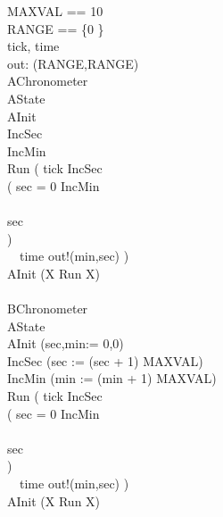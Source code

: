 \begin{circus}
MAXVAL == 10\\
RANGE == \{0 \}\\
\circchannel tick, time\\
\circchannel out: (RANGE,RANGE)\\
\circprocess AChronometer \circdef\\
\circbegin \circstate AState \\
 AInit \\
 IncSec \\
 IncMin \\
 Run \circdef
    (
        tick \then \lschexpract IncSec \rschexpract \circseq\\
          (
          \lcircguard sec = 0 \rcircguard \circguard
          \lschexpract IncMin \rschexpract\\
          \extchoice\\ \lcircguard sec  \rcircguard \circguard \Skip\\
          )\\
        \extchoice~~time \then out!(min,sec) \then \Skip
    )\\
\circspot AInit \circseq (\circmu X \circspot Run \circseq X)\\
\circend\\

\circprocess BChronometer \circdef\\
\circbegin \circstate AState \\
 AInit \circdef (sec,min:= 0,0)\\
 IncSec \circdef (sec := (sec + 1) \mod MAXVAL)\\
 IncMin \circdef (min := (min + 1) \mod MAXVAL)\\
 Run \circdef
    (
        tick \then IncSec \circseq\\
          (
          \lcircguard sec = 0 \rcircguard \circguard IncMin \\
          \extchoice\\ \lcircguard sec  \rcircguard \circguard \Skip\\
          )\\
        \extchoice~~time \then out!(min,sec) \then \Skip
    )\\
\circspot AInit \circseq (\circmu X \circspot Run \circseq X)\\
\circend

\end{circus}
